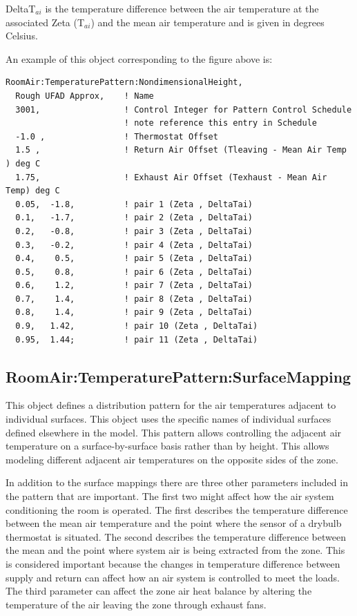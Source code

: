 DeltaT\(_{ai}\) is the temperature difference between the air temperature at the associated Zeta (T\(_{ai}\)) and the mean air temperature and is given in degrees Celsius.

An example of this object corresponding to the figure above is:

\begin{lstlisting}
RoomAir:TemperaturePattern:NondimensionalHeight,
  Rough UFAD Approx,    ! Name
  3001,                 ! Control Integer for Pattern Control Schedule
                        ! note reference this entry in Schedule
  -1.0 ,                ! Thermostat Offset
  1.5 ,                 ! Return Air Offset (Tleaving - Mean Air Temp ) deg C
  1.75,                 ! Exhaust Air Offset (Texhaust - Mean Air Temp) deg C
  0.05,  -1.8,          ! pair 1 (Zeta , DeltaTai)
  0.1,   -1.7,          ! pair 2 (Zeta , DeltaTai)
  0.2,   -0.8,          ! pair 3 (Zeta , DeltaTai)
  0.3,   -0.2,          ! pair 4 (Zeta , DeltaTai)
  0.4,    0.5,          ! pair 5 (Zeta , DeltaTai)
  0.5,    0.8,          ! pair 6 (Zeta , DeltaTai)
  0.6,    1.2,          ! pair 7 (Zeta , DeltaTai)
  0.7,    1.4,          ! pair 8 (Zeta , DeltaTai)
  0.8,    1.4,          ! pair 9 (Zeta , DeltaTai)
  0.9,   1.42,          ! pair 10 (Zeta , DeltaTai)
  0.95,  1.44;          ! pair 11 (Zeta , DeltaTai)
\end{lstlisting}

\subsection{RoomAir:TemperaturePattern:SurfaceMapping}\label{roomairtemperaturepatternsurfacemapping}

This object defines a distribution pattern for the air temperatures adjacent to individual surfaces. This object uses the specific names of individual surfaces defined elsewhere in the model. This pattern allows controlling the adjacent air temperature on a surface-by-surface basis rather than by height. This allows modeling different adjacent air temperatures on the opposite sides of the zone.

In addition to the surface mappings there are three other parameters included in the pattern that are important. The first two might affect how the air system conditioning the room is operated. The first describes the temperature difference between the mean air temperature and the point where the sensor of a drybulb thermostat is situated. The second describes the temperature difference between the mean and the point where system air is being extracted from the zone. This is considered important because the changes in temperature difference between supply and return can affect how an air system is controlled to meet the loads. The third parameter can affect the zone air heat balance by altering the temperature of the air leaving the zone through exhaust fans.

